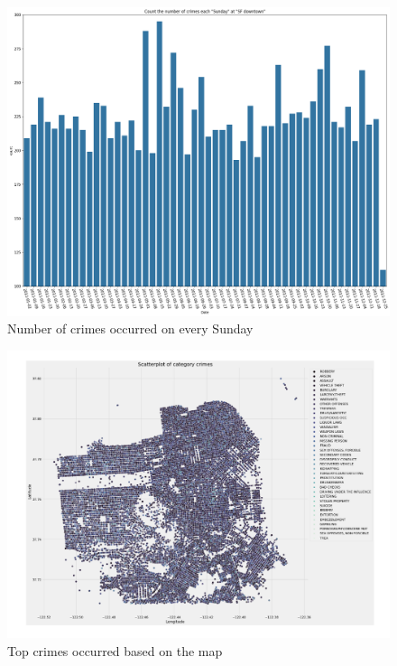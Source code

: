 \documentclass[10 pt,conference,final,]{IEEEtran}
\begin{document}
\begin{figure}

{\centering \includegraphics[width=0.85\linewidth]{img/fig9} 

}

\caption{Number of crimes occurred on every Sunday}\label{fig:unnamed-chunk-9}
\end{figure}

\begin{figure}

{\centering \includegraphics[width=0.8\linewidth]{img/fig10} 

}

\caption{Top crimes occurred based on the map}\label{fig:unnamed-chunk-10}
\end{figure}
\end{document}

